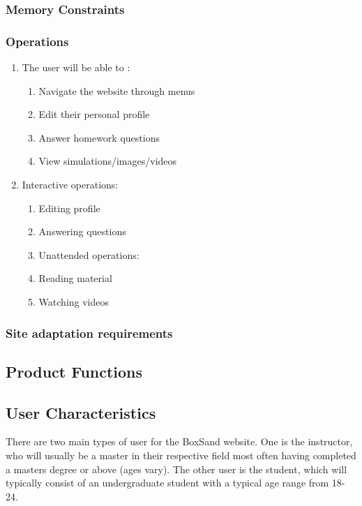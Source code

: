 \documentclass[onecolumn, draftclsnofoot,10pt, compsoc]{IEEEtran}
\begin{document}
\subsubsection{Memory Constraints}

\subsubsection{Operations}

\begin{enumerate}
\item The user will be able to :
\begin{enumerate}
\item Navigate the website through menus
\item Edit their personal profile
\item Answer homework questions
\item View simulations/images/videos
\end{enumerate}
\item Interactive operations:
\begin{enumerate}
\item Editing profile
\item Answering questions
\item Unattended operations:
\item Reading material
\item Watching videos
\end{enumerate}
\end{enumerate}

\subsubsection{Site adaptation requirements}

\subsection{Product Functions}

\subsection{User Characteristics}
There are two main types of user for the BoxSand website. One is the instructor, who will usually be a master in their respective field most often having completed a masters degree or above (ages vary). The other user is the student, which will typically consist of an undergraduate student with a typical age range from 18-24. 
\end{document}
